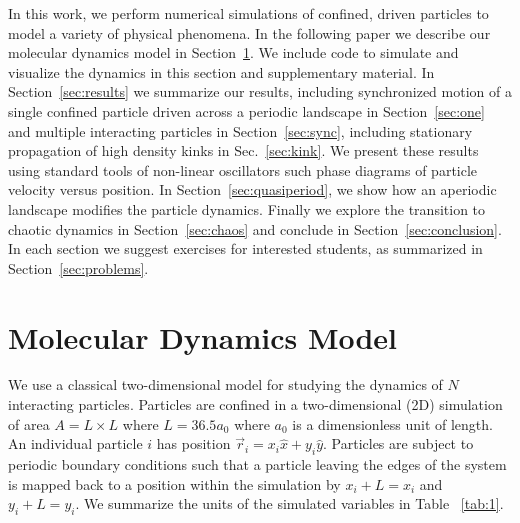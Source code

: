 \documentclass[prb,preprint]{revtex4}
\begin{document}
In this work,
we perform 
numerical simulations of confined, driven particles
to model a variety of physical phenomena.
In the following paper we describe
our molecular dynamics model in Section~\ref{sec:MD}.
We include code to simulate
and visualize the dynamics in this section
and supplementary material.
In Section~\ref{sec:results} we summarize
our results,
including synchronized motion of a single confined particle
driven across a periodic landscape in 
Section~\ref{sec:one} and
multiple interacting particles
in Section~\ref{sec:sync},
including stationary propagation of high density kinks
in Sec.~\ref{sec:kink}.
We present these results using standard tools of non-linear oscillators
such phase diagrams of particle velocity versus position.
In Section~\ref{sec:quasiperiod},
we show how an aperiodic landscape modifies the particle dynamics.
Finally we explore the transition to chaotic dynamics in 
Section~\ref{sec:chaos}
and conclude 
in Section~\ref{sec:conclusion}. 
In each section
we suggest exercises for interested students,
as summarized in Section~\ref{sec:problems}.



\section{Molecular Dynamics Model}
\label{sec:MD}
We use a classical two-dimensional model for 
studying the dynamics of $N$ interacting particles. 
Particles are confined in a two-dimensional (2D) 
simulation of area $A = L \times L$ where $L=36.5 a_0$
where $a_0$ is a dimensionless unit of length.
An individual particle $i$ has
position $\vec{r}_i = x_i \hat{x} + y_i \hat{y}$.
Particles are subject to
periodic boundary conditions
such that a particle leaving the edges of the system is mapped
back to a position within the simulation 
by $x_i+L=x_i$ and $y_i+L=y_i$.
We summarize the units of the simulated variables in Table ~\ref{tab:1}.
\end{document}
